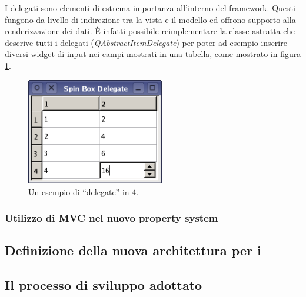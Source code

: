 I delegati sono elementi di estrema importanza all'interno del framework. Questi fungono da livello di indirezione tra la vista e il modello ed offrono supporto alla renderizzazione dei dati. È infatti possibile reimplementare la classe astratta che descrive tutti i delegati (\emph{QAbstractItemDelegate}) per poter ad esempio inserire diversi widget di input nei campi mostrati in una tabella, come mostrato in figura \ref{figura:qt_delegate}.

\begin{figure}[!htb]
	\centering
	\includegraphics[width=6cm]{images/spinboxdelegate-example.png}
	\caption{Un esempio di ``delegate'' in \qt{}$4$.}
	\label{figura:qt_delegate}
\end{figure}

\subsubsection*{Utilizzo di MVC nel nuovo property system}

\subsection{Definizione della nuova architettura per i \plugin{}}

\subsection{Il processo di sviluppo adottato}

